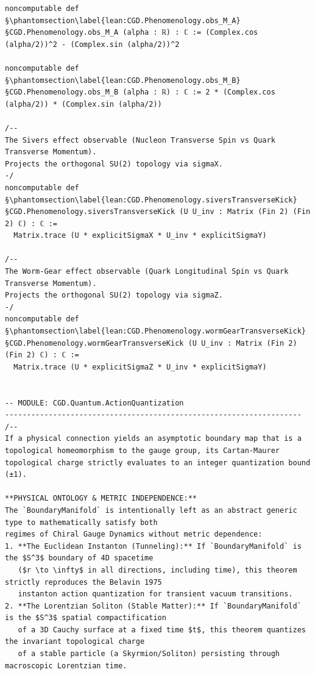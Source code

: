 \begin{verbatim}
noncomputable def §\phantomsection\label{lean:CGD.Phenomenology.obs_M_A}§CGD.Phenomenology.obs_M_A (alpha : ℝ) : ℂ := (Complex.cos (alpha/2))^2 - (Complex.sin (alpha/2))^2

noncomputable def §\phantomsection\label{lean:CGD.Phenomenology.obs_M_B}§CGD.Phenomenology.obs_M_B (alpha : ℝ) : ℂ := 2 * (Complex.cos (alpha/2)) * (Complex.sin (alpha/2))

/--
The Sivers effect observable (Nucleon Transverse Spin vs Quark Transverse Momentum).
Projects the orthogonal SU(2) topology via sigmaX.
-/
noncomputable def §\phantomsection\label{lean:CGD.Phenomenology.siversTransverseKick}§CGD.Phenomenology.siversTransverseKick (U U_inv : Matrix (Fin 2) (Fin 2) ℂ) : ℂ :=
  Matrix.trace (U * explicitSigmaX * U_inv * explicitSigmaY)

/--
The Worm-Gear effect observable (Quark Longitudinal Spin vs Quark Transverse Momentum).
Projects the orthogonal SU(2) topology via sigmaZ.
-/
noncomputable def §\phantomsection\label{lean:CGD.Phenomenology.wormGearTransverseKick}§CGD.Phenomenology.wormGearTransverseKick (U U_inv : Matrix (Fin 2) (Fin 2) ℂ) : ℂ :=
  Matrix.trace (U * explicitSigmaZ * U_inv * explicitSigmaY)


-- MODULE: CGD.Quantum.ActionQuantization
--------------------------------------------------------------------
/--
If a physical connection yields an asymptotic boundary map that is a topological homeomorphism to the gauge group, its Cartan-Maurer topological charge strictly evaluates to an integer quantization bound (±1).

**PHYSICAL ONTOLOGY & METRIC INDEPENDENCE:**
The `BoundaryManifold` is intentionally left as an abstract generic type to mathematically satisfy both 
regimes of Chiral Gauge Dynamics without metric dependence:
1. **The Euclidean Instanton (Tunneling):** If `BoundaryManifold` is the $S^3$ boundary of 4D spacetime 
   ($r \to \infty$ in all directions, including time), this theorem strictly reproduces the Belavin 1975 
   instanton action quantization for transient vacuum transitions.
2. **The Lorentzian Soliton (Stable Matter):** If `BoundaryManifold` is the $S^3$ spatial compactification 
   of a 3D Cauchy surface at a fixed time $t$, this theorem quantizes the invariant topological charge 
   of a stable particle (a Skyrmion/Soliton) persisting through macroscopic Lorentzian time.


\end{verbatim}
